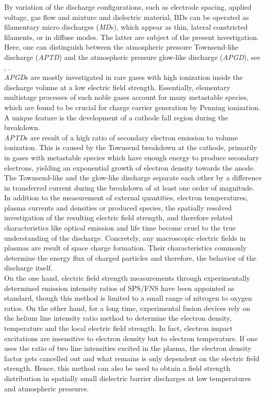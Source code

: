 \documentclass[a4paper,10pt,twoside]{article}
\newcommand{\tilt}[1]{\textit{#1}}
\begin{document}
		
		By variation of the discharge configurations, such as electrode spacing, applied voltage, gas flow and mixture and dielectric material, BDs can be operated as filamentary micro discharges (\tilt{MD}s), which appear as thin, lateral constricted filaments, or in diffuse modes. The latter are subject of the present investigation. Here, one can distinguish between the atmospheric pressure Townsend-like discharge (\tilt{APTD}) and the atmospheric pressure glow-like discharge (\tilt{APGD}), see \cite{Massines2009}, \cite{Massines}.\\
		\tilt{APGD}s are mostly investigated in rare gases with high ionization inside the discharge volume at a low electric field strength. Essentially, elementary multistage processes of such noble gases account for many metastable species, which are found to be crucial for charge carrier generation by Penning ionization. A unique feature is the development of a cathode fall region during the breakdown.\\		
		\tilt{APTD}s are result of a high ratio of secondary electron emission to volume ionization. This is caused by the Townsend breakdown at the cathode, primarily in gases with metastable species which have enough energy to produce secondary electrons, yielding an exponential growth of electron density towards the anode.\\
		The Townsend-like and the glow-like discharge separate each other by a difference in transferred current during the breakdown of at least one order of magnitude. In addition to the measurement of external quantities, electron temperatures, plasma currents and densities or produced species, the spatially resolved investigation of the resulting electric field strength, and therefore related characteristics like optical emission and life time become cruel to the true understanding of the discharge. Concretely, any macroscopic electric fields in plasmas are result of space charge formation. Their characteristics commonly determine the energy flux of charged particles and therefore, the behavior of the discharge itself. \\
		On the one hand, electric field strength measurements through experimentally determined emission intensity ratios of SPS/FNS have been appointed as standard, though this method is limited to a small range of nitrogen to oxygen ratios. On the other hand, for a long time, experimental fusion devices rely on the helium line intensity ratio method to determine the electron density, temperature and the local electric field strength. In fact, electron impact excitations are insensitive to electron density but to electron temperature. If one uses the ratio of two line intensities excited in the plasma, the electron density factor gets cancelled out and what remains is only dependent on the electric field strength. Hence, this method can also be used to obtain a field strength distribution in spatially small dielectric barrier discharges at low temperatures and atmospheric pressures.\\
\end{document}
